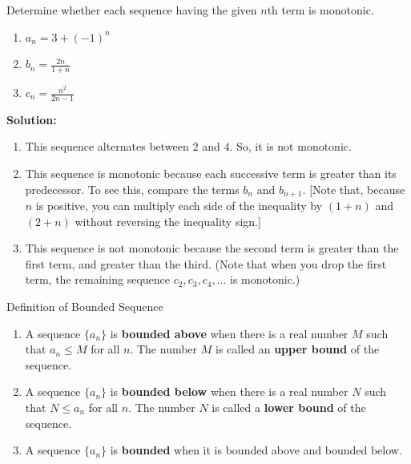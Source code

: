 \documentclass[12pt]{article}
\theoremstyle{beautifulthm}
\begin{document}
\begin{tcolorbox}[colback=examplebg, colframe=red!75!black, title=\textbf{EXAMPLE 6:  Determining Whether a Sequence is Monotonic}, fonttitle=\bfseries, sharp corners]

Determine whether each sequence having the given $n$th term is monotonic.

\begin{enumerate}
    \item $a_n = 3 + (-1)^n$

    \item $b_n = \frac{2n}{1 + n}$

    \item $c_n = \frac{n^2}{2n - 1}$
\end{enumerate}


\tcblower
\textbf{Solution:} 
\begin{enumerate}
    \item This sequence alternates between $2$ and $4$. So, it is not monotonic.

    \item This sequence is monotonic because each successive term is greater than its predecessor. To see this, compare the terms $b_n$ and $b_{n+1}$. [Note that, because $n$ is positive, you can multiply each side of the inequality by $(1 + n)$ and $(2 + n)$ without reversing the inequality sign.]


    \item This sequence is not monotonic because the second term is greater than the first term, and greater than the third. (Note that when you drop the first term, the remaining sequence $c_2, c_3, c_4, \dots$ is monotonic.)
\end{enumerate}
\end{tcolorbox}

\newpage

\begin{Definition}{Definition of Bounded Sequence}{}
    \begin{enumerate}
    \item A sequence $\{a_n\}$ is \textbf{bounded above} when there is a real number $M$ such that $a_n \leq M$ for all $n$. The number $M$ is called an \textbf{upper bound} of the sequence.

    \item A sequence $\{a_n\}$ is \textbf{bounded below} when there is a real number $N$ such that $N \leq a_n$ for all $n$. The number $N$ is called a \textbf{lower bound} of the sequence.

    \item A sequence $\{a_n\}$ is \textbf{bounded} when it is bounded above and bounded below.
\end{enumerate}
\end{Definition}
\end{document}
